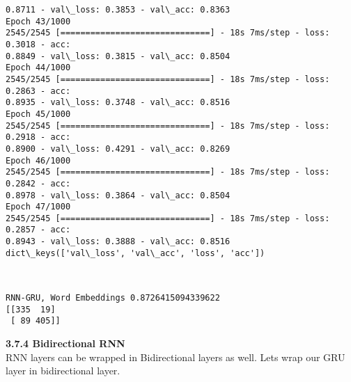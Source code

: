 \documentclass[11pt]{article}
\begin{document}
\begin{Verbatim}[commandchars=\\\{\}]
0.8711 - val\_loss: 0.3853 - val\_acc: 0.8363
Epoch 43/1000
2545/2545 [==============================] - 18s 7ms/step - loss: 0.3018 - acc:
0.8849 - val\_loss: 0.3815 - val\_acc: 0.8504
Epoch 44/1000
2545/2545 [==============================] - 18s 7ms/step - loss: 0.2863 - acc:
0.8935 - val\_loss: 0.3748 - val\_acc: 0.8516
Epoch 45/1000
2545/2545 [==============================] - 18s 7ms/step - loss: 0.2918 - acc:
0.8900 - val\_loss: 0.4291 - val\_acc: 0.8269
Epoch 46/1000
2545/2545 [==============================] - 18s 7ms/step - loss: 0.2842 - acc:
0.8978 - val\_loss: 0.3864 - val\_acc: 0.8504
Epoch 47/1000
2545/2545 [==============================] - 18s 7ms/step - loss: 0.2857 - acc:
0.8943 - val\_loss: 0.3888 - val\_acc: 0.8516
dict\_keys(['val\_loss', 'val\_acc', 'loss', 'acc'])
\end{Verbatim}

    \begin{center}
    \end{center}
    { \hspace*{\fill} \\}
    
    \begin{Verbatim}[commandchars=\\\{\}]
RNN-GRU, Word Embeddings 0.8726415094339622
[[335  19]
 [ 89 405]]
\end{Verbatim}

    \textbf{3.7.4 Bidirectional RNN}\\
RNN layers can be wrapped in Bidirectional layers as well. Lets wrap our
GRU layer in bidirectional layer.
\end{document}
